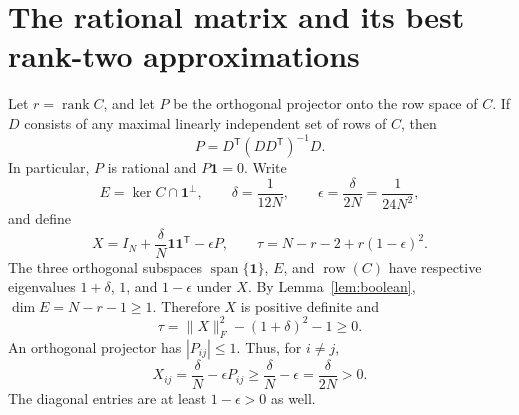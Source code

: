 \documentclass[11pt]{article}
\newcommand{\rank}{\operatorname{rank}}
\newcommand{\one}{\mathbf 1}
\begin{document}
\section{The rational matrix and its best rank-two approximations}
Let $r=\rank C$, and let $P$ be the orthogonal projector onto the row space of $C$. If $D$ consists of any maximal linearly independent set of rows of $C$, then
\begin{equation}\label{eq:projector}
 P=D^{\mathsf T}(DD^{\mathsf T})^{-1}D.
\end{equation}
In particular, $P$ is rational and $P\one=0$. Write
\[
 E=\ker C\cap\one^\perp,\qquad
 \delta=\frac1{12N},\qquad \epsilon=\frac{\delta}{2N}=\frac1{24N^2},
\]
and define
\begin{equation}\label{eq:input}
 X=I_N+\frac\delta N\one\one^{\mathsf T}-\epsilon P,
 \qquad
 \tau=N-r-2+r(1-\epsilon)^2.
\end{equation}
The three orthogonal subspaces $\operatorname{span}\{\one\}$, $E$, and $\operatorname{row}(C)$ have respective eigenvalues $1+\delta$, $1$, and $1-\epsilon$ under $X$. By Lemma~\ref{lem:boolean}, $\dim E=N-r-1\geq1$. Therefore $X$ is positive definite and
\begin{equation}\label{eq:error}
 \tau=\|X\|_F^2-(1+\delta)^2-1\geq0.
\end{equation}
An orthogonal projector has $|P_{ij}|\leq1$. Thus, for $i\ne j$,
\[
 X_{ij}=\frac\delta N-\epsilon P_{ij}
 \geq\frac\delta N-\epsilon=\frac\delta{2N}>0.
\]
The diagonal entries are at least $1-\epsilon>0$ as well.
\end{document}
